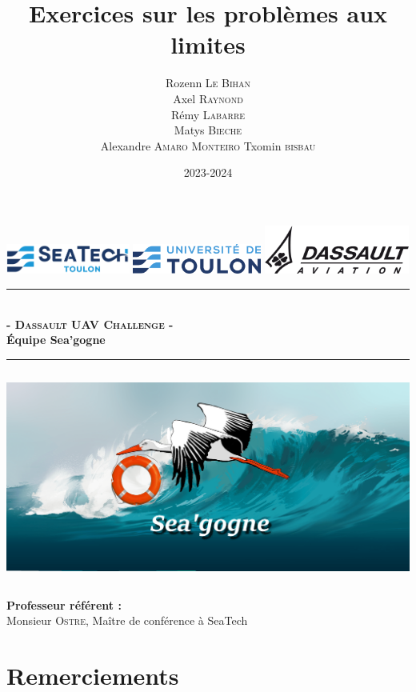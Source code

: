 \documentclass[a4paper,12pt,french]{report}
\author{Rozenn \textsc{Le Bihan}
\\Axel \textsc{Raynond}
\\Rémy \textsc{Labarre}
\\Matys \textsc{Bieche}
\\Alexandre \textsc{Amaro Monteiro}\vskip0.1cm
Txomin \textsc{bisbau}}
\date{2023-2024}
\title{{Exercices sur les problèmes aux limites}}
\begin{document}
\begin{titlepage}
    \makeatletter
    \noindent
    \includegraphics[height=1cm]{figures/logosea.png}
    \includegraphics[height=1cm]{figures/logouniv.png}
    \hfill
    \includegraphics[height=1.6cm]{figures/logodassault.png}
    \vfill
    \begin{center}
        \rule{0.95\textwidth}{2pt}\vspace{0.3\baselineskip}\\
        \LARGE \textbf{\textsc{- Dassault UAV Challenge -}\vspace{0.51\baselineskip}\\ \'Equipe Sea'gogne} \normalsize\\
        \rule{0.95\textwidth}{2pt}\vskip1cm
        \includegraphics[height=7cm]{figures/seagogne.png}\vskip1cm
        {\large\@author}\vskip2cm
    \end{center}
    \textbf{Professeur référent :}
    \\Monsieur \textsc{Ostre}, Maître de conférence à SeaTech
    \vskip0.5cm
    \centering
    \@date
    \makeatother
\end{titlepage}

\thispagestyle{empty}


\chapter*{Remerciements}
\end{document}
